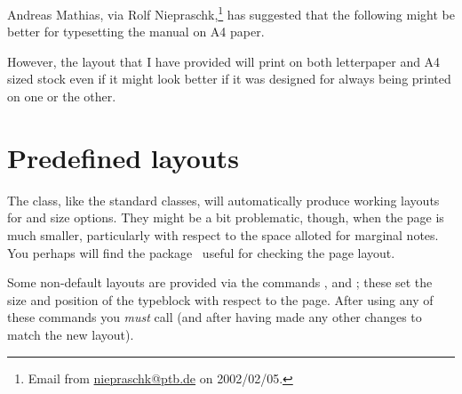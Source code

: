     Andreas Mathias, via Rolf Niepraschk,\footnote{Email 
from \url{niepraschk@ptb.de} on 2002/02/05.}
has suggested that the following might be better for typesetting the manual
on A4 paper.

    However, the layout that I have provided will print on both letterpaper
and A4 sized stock even if it might look better if it was designed for always
being printed on one or the other.

\section{Predefined layouts}
\label{sec:predefined-layouts}


    The class, like the standard classes, will automatically produce 
working layouts for 
and  size options. They might be a bit problematic, though,
when the page is much smaller, particularly with respect to the space 
alloted for marginal notes. You perhaps will find the 
package~\cite{LAYOUTS} useful for checking the page layout.

   Some non-default layouts are provided via the commands \cmd{\medievalpage},
\cmd{\isopage} and \cmd{\semiisopage}; these set the size and position of the
typeblock with respect to the page. After using any of these commands you
\emph{must} call \cmd{\checkandfixthelayout} (and after having made any other
changes to match the new layout).

